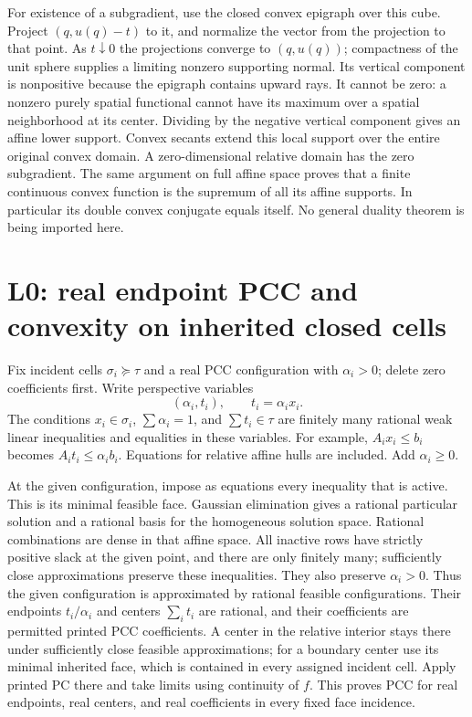 \documentclass[
  11pt,
]{article}
\begin{document}
For existence of a subgradient, use the closed convex epigraph over this
cube. Project \((q,u(q)-t)\) to it, and normalize the vector from the
projection to that point. As \(t\downarrow0\) the projections converge
to \((q,u(q))\); compactness of the unit sphere supplies a limiting
nonzero supporting normal. Its vertical component is nonpositive because
the epigraph contains upward rays. It cannot be zero: a nonzero purely
spatial functional cannot have its maximum over a spatial neighborhood
at its center. Dividing by the negative vertical component gives an
affine lower support. Convex secants extend this local support over the
entire original convex domain. A zero-dimensional relative domain has
the zero subgradient. The same argument on full affine space proves that
a finite continuous convex function is the supremum of all its affine
supports. In particular its double convex conjugate equals itself. No
general duality theorem is being imported here.

\section{L0: real endpoint PCC and convexity on inherited closed
cells}\label{l0-real-endpoint-pcc-and-convexity-on-inherited-closed-cells}

Fix incident cells \(\sigma_i\succeq\tau\) and a real PCC configuration
with \(\alpha_i>0\); delete zero coefficients first. Write perspective
variables \[ (\alpha_i,t_i),\qquad t_i=\alpha_i x_i. \] The conditions
\(x_i\in\sigma_i\), \(\sum\alpha_i=1\), and \(\sum t_i\in\tau\) are
finitely many rational weak linear inequalities and equalities in these
variables. For example, \(A_i x_i\leq b_i\) becomes
\(A_i t_i\leq\alpha_i b_i\). Equations for relative affine hulls are
included. Add \(\alpha_i\geq0\).

At the given configuration, impose as equations every inequality that is
active. This is its minimal feasible face. Gaussian elimination gives a
rational particular solution and a rational basis for the homogeneous
solution space. Rational combinations are dense in that affine space.
All inactive rows have strictly positive slack at the given point, and
there are only finitely many; sufficiently close approximations preserve
these inequalities. They also preserve \(\alpha_i>0\). Thus the given
configuration is approximated by rational feasible configurations. Their
endpoints \(t_i/\alpha_i\) and centers \(\sum_i t_i\) are rational, and
their coefficients are permitted printed PCC coefficients. A center in
the relative interior stays there under sufficiently close feasible
approximations; for a boundary center use its minimal inherited face,
which is contained in every assigned incident cell. Apply printed PC
there and take limits using continuity of \(f\). This proves PCC for
real endpoints, real centers, and real coefficients in every fixed face
incidence.
\end{document}
